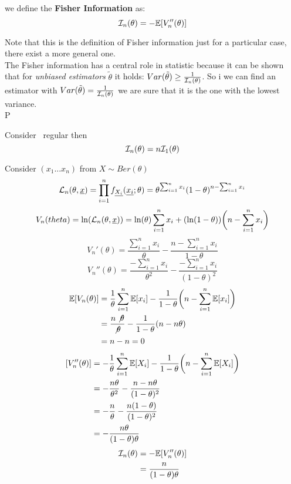\begin{defi}
	we define the \textbf{Fisher Information} as:
	$$\mathcal{I}_n(\theta)=-\mathbb{E}[V_n''(\theta)]$$
\end{defi}
Note that this is the definition of Fisher information just for a particular case, there exist a more general one.\\
The Fisher information has a central role in statistic because it can be shown that for \textit{unbiased estimators} $\tilde \theta$ it holds: $Var(\tilde \theta)\geq \frac{1}{\mathcal{I}_n(\theta)}$. So i we can find an estimator with  $Var(\tilde \theta)= \frac{1}{\mathcal{I}_n(\theta)}$ we are sure that it is the one with the lowest variance.\\
P\begin{prop}
	Consider \rsf \  regular then
	$$\mathcal{I}_n(\theta)=n\mathcal{I}_1(\theta)$$
\end{prop}
\begin{eg}
	Consider $(x_1...x_n)$ from $X\sim Ber(\theta)$
	$$\mathcal{L}_n(\theta,\underline x) = \prod_{i=1}^{n} f_{\underline{X_i}}(\underline{x_i};\theta)=\theta^{\sum_{i=1}^{n}x_i}(1-\theta)^{n-\sum_{i=1}^{n}x_i}$$
	$$V_n(theta)=\ln(\mathcal{L}_n(\theta,\underline x))=\ln(\theta)\sum_{i=1}^{n}x_i+(\ln(1-\theta))\bigg(n-\sum_{i=1}^{n}x_i\bigg)$$
	$$V_n'(\theta)=\frac{\sum_{i=1}^{n}x_i}{\theta}-\frac{n- \sum_{i=1}^{n}x_i}{1-\theta}$$
	$$V_n''(\theta)=\frac{-\sum_{i=1}^{n}x_i}{\theta^2}-\frac{-\sum_{i=1}^{n}x_i}{(1-\theta)^2}$$
	\[
	\begin{split}
	\mathbb{E}[V_n(\theta)]
	&	=\frac{1}{\theta}\sum_{i=1}^{n}\mathbb{E}[x_i]-\frac{1}{1-\theta}\bigg( n- \sum_{i=1}^{n}\mathbb{E}[x_i]\bigg)\\
	&=\frac{n\not \theta}{\not \theta}-\frac{1}{1-\theta}(n-n\theta)\\
	&=n-n=0
	\end{split}
	\]
	\[
	\begin{split}
		[V_n''(\theta)]
		&=-\frac{1}{\theta}\sum_{i=1}^{n}\mathbb{E}[X_i]-\frac{1}{1-\theta}\bigg( n- \sum_{i=1}^{n}\mathbb{E}[X_i] \bigg)\\
		&=-\frac{n\theta}{\theta^2}-\frac{n-n\theta}{(1-\theta)^2}\\
		&=-\frac{n}{\theta}-\frac{n(1-\theta)}{(1-\theta)^2}\\
		&=-\frac{n\theta}{(1-\theta)\theta}
	\end{split}
	\]
	\[
	\begin{split}
	\mathcal{I}_n(\theta)
	&=-\mathbb{E}[V_n''(\theta)]\\
	&=\frac{n}{(1-\theta)\theta}
	\end{split}
	\]
\end{eg}

